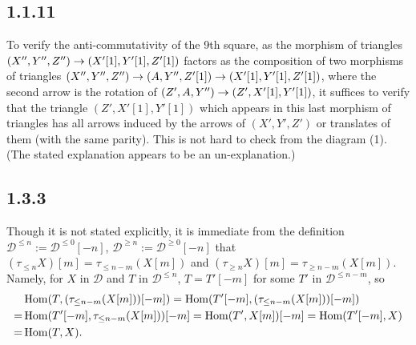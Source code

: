 \documentclass[deligne.tex]{subfiles}
\begin{document}
	\subsection*{1.1.11} To verify the anti-commutativity of the 9th square, as
	the morphism of triangles $(X'',Y'',Z'')\rightarrow(X'[1],Y'[1],Z'[1])$ factors
	as the composition of two morphisms of triangles
	$(X'',Y'',Z'')\rightarrow(A,Y'',Z'[1])\rightarrow(X'[1],Y'[1],Z'[1])$, where the second
	arrow is the rotation of $(Z',A,Y'')\rightarrow(Z',X'[1],Y'[1])$, it suffices
	to verify that the triangle $(Z',X'[1],Y'[1])$ which appears in this last
	morphism of triangles has all arrows induced by the arrows of
	$(X',Y',Z')$ or translates of them (with the same parity).
	This is not hard to check from the diagram (1).
	(The stated explanation appears to be an un-explanation.)
	
	\subsection*{1.3.3} Though it is not stated explicitly, it is immediate from
	the definition $\mathcal D^{\leq n}:=\mathcal D^{\leq 0}[-n]$,
	$\mathcal D^{\geq n}:=\mathcal D^{\geq 0}[-n]$ that
	$(\tau_{\leq n}X)[m]=\tau_{\leq n-m}(X[m])$ and
	$(\tau_{\geq n}X)[m]=\tau_{\geq n-m}(X[m])$.
	Namely, for $X$ in $\mathcal D$ and $T$ in $\mathcal D^{\leq n}$,
	$T=T'[-m]$ for some $T'$ in $\mathcal D^{\leq n-m}$, so
	\begin{align*}
		&\operatorname{Hom}(T,(\tau_{\leq n-m}(X[m]))[-m])
		=\operatorname{Hom}(T'[-m], (\tau_{\leq n-m}(X[m]))[-m]) \\
		=&\operatorname{Hom}(T'[-m],\tau_{\leq n-m}(X[m]))[-m]
		=\operatorname{Hom}(T',X[m])[-m]
		=\operatorname{Hom}(T'[-m],X) \\
		=&\operatorname{Hom}(T,X).
	\end{align*}
	
\end{document}
